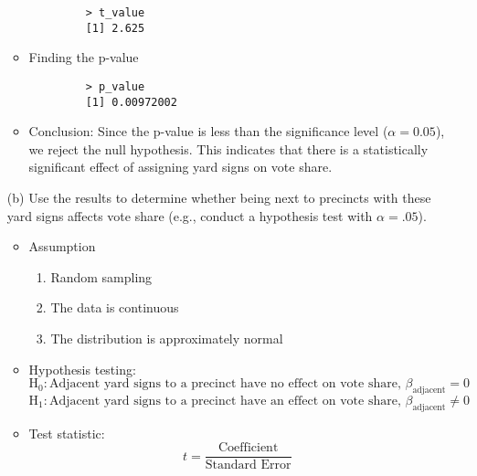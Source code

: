 \documentclass[12pt,letterpaper]{article}
\begin{document}
\begin{enumerate}
		
		\begin{verbatim}
			> t_value
			[1] 2.625
		\end{verbatim}
		\begin{itemize}
			\item Finding the p-value
		\end{itemize}
		
		\begin{verbatim}
			> p_value
			[1] 0.00972002
		\end{verbatim}
	\begin{itemize}
		\item Conclusion:
		\newline
		Since the p-value is less than the significance level (\(\alpha = 0.05\)), we reject the null hypothesis. This indicates that there is a statistically significant effect of assigning yard signs on vote share.
	\end{itemize}
	\newpage		
	\item [(b)]  Use the results to determine whether being
	next to precincts with these yard signs affects vote
	share (e.g., conduct a hypothesis test with $\alpha = .05$).
	\begin{itemize}
		\item Assumption
	\begin{enumerate}
		\item Random sampling
		\item The data is continuous
		\item The distribution is approximately normal	  	
	\end{enumerate}
		\item Hypothesis testing:
		\[
		\text{H}_0: \text{Adjacent yard signs to a precinct have no effect on vote share, } \beta_{\text{adjacent}} = 0
		\]
		\[
		\text{H}_1: \text{Adjacent yard signs to a precinct have an effect on vote share, } \beta_{\text{adjacent}} \neq 0
		\]
		
		\item Test statistic:
		\[
		t = \frac{\text{Coefficient}}{\text{Standard Error}}
		\]
	\end{itemize}
	

\end{enumerate}
\end{document}
